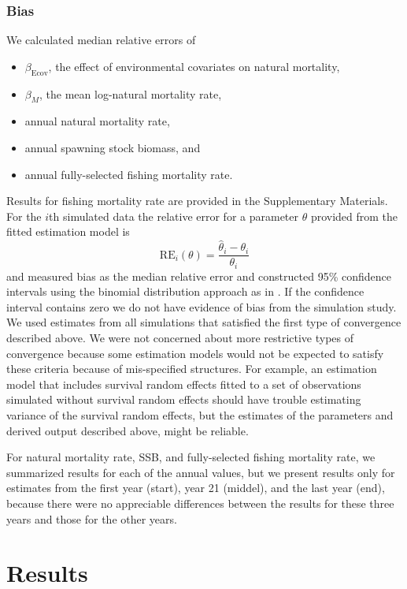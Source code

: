 \documentclass[
  12pt,
]{article}
\begin{document}
\hypertarget{bias}{%
\subsubsection*{Bias}\label{bias}}

We calculated median relative errors of

\begin{itemize}
\item $\beta_\text{Ecov}$, the effect of environmental covariates on natural mortality, 
\item $\beta_M$, the mean log-natural mortality rate,
\item annual natural mortality rate,
\item annual spawning stock biomass, and
\item annual fully-selected fishing mortality rate.
\end{itemize}

Results for fishing mortality rate are provided in the Supplementary
Materials. For the \(i\)th simulated data the relative error for a
parameter \(\theta\) provided from the fitted estimation model is \[
{\text{RE}_i}\left(\theta\right) = \frac{\widehat \theta_i - \theta_i}{\theta_i}
\] and measured bias as the median relative error and constructed 95\%
confidence intervals using the binomial distribution approach as in
\citet{stockmiller21}. If the confidence interval contains zero we do
not have evidence of bias from the simulation study. We used estimates
from all simulations that satisfied the first type of convergence
described above. We were not concerned about more restrictive types of
convergence because some estimation models would not be expected to
satisfy these criteria because of mis-specified structures. For example,
an estimation model that includes survival random effects fitted to a
set of observations simulated without survival random effects should
have trouble estimating variance of the survival random effects, but the
estimates of the parameters and derived output described above, might be
reliable.

For natural mortality rate, SSB, and fully-selected fishing mortality
rate, we summarized results for each of the annual values, but we
present results only for estimates from the first year (start), year 21
(middel), and the last year (end), because there were no appreciable
differences between the results for these three years and those for the
other years.

\hypertarget{results}{%
\section*{Results}\label{results}}
\end{document}

